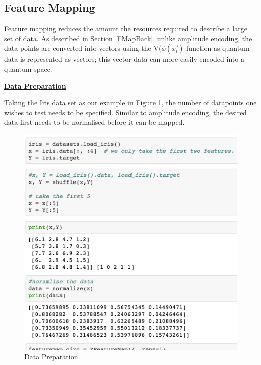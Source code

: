 \subsection{Feature Mapping}
\label{FMapp}
Feature mapping reduces the amount the resources required to describe a large set of data.
As described in Section \ref{FMapBack}, unlike amplitude encoding, the data points are converted into vectors using the V($\phi(\overrightarrow{x_i})$ function as quantum data is represented as vectors; this vector data can more easily encoded into a quantum space. 

\vspace{0.3cm}
\textbf{\underline{Data Preparation}}

Taking the Iris data set as our example in Figure \ref{DPrep}, the number of datapoints one wishes to test  needs to be specified. Similar to amplitude encoding, the desired data first needs to be normalised before it can be mapped. 

\begin{figure}[H]
      \centering
      \includegraphics[scale=0.5]{background/DataNorm.png}
      \caption{Data Preparation}
      \label{DPrep}
\end{figure}

